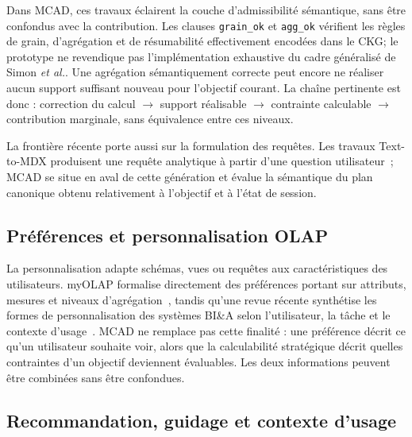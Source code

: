 \documentclass[journal]{IEEEtran}
\begin{document}
Dans MCAD, ces travaux éclairent la couche d'admissibilité sémantique, sans être confondus avec la contribution. Les clauses \texttt{grain\_ok} et \texttt{agg\_ok} vérifient les règles de grain, d'agrégation et de résumabilité effectivement encodées dans le CKG; le prototype ne revendique pas l'implémentation exhaustive du cadre généralisé de Simon \emph{et al.}. Une agrégation sémantiquement correcte peut encore ne réaliser aucun support suffisant nouveau pour l'objectif courant. La chaîne pertinente est donc : correction du calcul $\rightarrow$ support réalisable $\rightarrow$ contrainte calculable $\rightarrow$ contribution marginale, sans équivalence entre ces niveaux.

La frontière récente porte aussi sur la formulation des requêtes. Les travaux Text-to-MDX produisent une requête analytique à partir d'une question utilisateur~\cite{BimonteRizziTextToMDX2026}; MCAD se situe en aval de cette génération et évalue la sémantique du plan canonique obtenu relativement à l'objectif et à l'état de session.

\subsection{Préférences et personnalisation OLAP}

La personnalisation adapte schémas, vues ou requêtes aux caractéristiques des utilisateurs. myOLAP formalise directement des préférences portant sur attributs, mesures et niveaux d'agrégation~\cite{GolfarelliRizziBiondi2011}, tandis qu'une revue récente synthétise les formes de personnalisation des systèmes BI\&A selon l'utilisateur, la tâche et le contexte d'usage~\cite{JacobGunklachMaedche2025}. MCAD ne remplace pas cette finalité : une préférence décrit ce qu'un utilisateur souhaite voir, alors que la calculabilité stratégique décrit quelles contraintes d'un objectif deviennent évaluables. Les deux informations peuvent être combinées sans être confondues.

\subsection{Recommandation, guidage et contexte d'usage}
\end{document}
